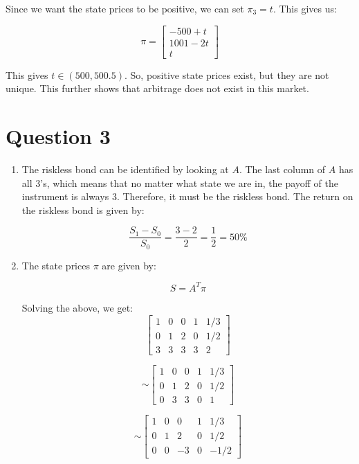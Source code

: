 \documentclass[a4paper]{article}
\begin{document}
\begin{enumerate}[label=(\alph*)]
    Since we want the state prices to be positive, we can set $\pi_{3} = t$. This gives us:

    \[ \pi = \begin{bmatrix} -500 + t \\ 1001 - 2t \\ t \end{bmatrix} \]

    This gives $t \in (500, 500.5)$. So, positive state prices exist, but they are not unique. This further shows that arbitrage does not exist in this market.
\end{enumerate}


\newpage
\section*{Question 3}
\begin{enumerate}[label=(\alph*)]
    \item The riskless bond can be identified by looking at $A$. The last column of $A$ has all $3$'s, which means that no matter what state we are in, the payoff of the instrument is always $3$. Therefore, it must be the riskless bond. The return on the riskless bond is given by:

    \[ \frac{S_{1} - S_{0}}{S_{0}} = \frac{3 - 2}{2} = \frac{1}{2} = 50\% \]

    \vspace{5mm}
    \item The state prices $\pi$ are given by:

    \[ S = A^{T}\pi \]

    Solving the above, we get:
    \[ \left[\begin{array}{cccc|c}
        1 & 0 & 0 & 1 & 1/3 \\ 
        0 & 1 & 2 & 0 & 1/2 \\ 
        3 & 3 & 3 & 3 & 2
    \end{array}\right] \]

    \[ \sim \left[\begin{array}{cccc|c}
        1 & 0 & 0 & 1 & 1/3 \\ 
        0 & 1 & 2 & 0 & 1/2 \\ 
        0 & 3 & 3 & 0 & 1
    \end{array}\right] \]

    \[ \sim \left[\begin{array}{cccc|c}
        1 & 0 & 0 & 1 & 1/3 \\ 
        0 & 1 & 2 & 0 & 1/2 \\ 
        0 & 0 & -3 & 0 & -1/2
    \end{array}\right] \]


\end{enumerate}
\end{document}
